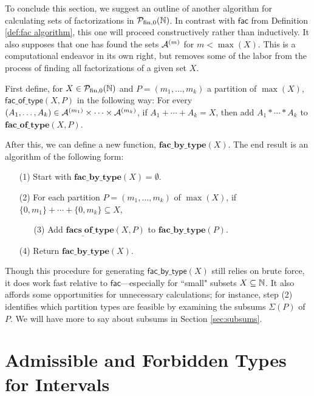 To conclude this section, we suggest an outline of another algorithm for calculating sets of factorizations in ${\mathcal{P}_{\textrm{fin},0}(\mathbb{N})}$.
In contrast with $\mathsf{fac}$ from Definition \ref{def:fac algorithm}, this one will proceed constructively rather than inductively.
It also supposes that one has found the sets $\mathcal{A}^{(m)}$ for $m < \max(X)$.
This is a computational endeavor in its own right, but removes some of the labor from the process of finding all factorizations of a given set $X$.

First define, for $X\in {\mathcal{P}_{\textrm{fin},0}(\mathbb{N})}$ and $P = (m_1,\dots,m_k)$ a partition of $\max(X)$, $\mathsf{fac\_of\_type}(X,P)$ in the following way:
For every $(A_1,\dots,A_k)\in \mathcal{A}^{(m_1)}\times\cdots\times\mathcal{A}^{(m_k)}$, if $A_1 + \cdots + A_k = X$, then add $A_1 * \cdots * A_k$ to $\mathbf{fac\_of\_type}(X,P)$.

After this, we can define a new function, $\mathbf{fac\_by\_type}(X)$.
The end result is an algorithm of the following form:
\begin{itemize}
	\item[(1)] Start with $\mathbf{fac\_by\_type}(X) = \emptyset$.
	\item[(2)] For each partition $P=(m_1,\dots, m_k)$ of $\max(X)$, if $\{0,m_1\}+\cdots+\{0,m_k\} \subseteq X$,
	\begin{itemize}
		\item[(3)] Add $\mathbf{facs_\_of\_type}(X,P)$ to $\mathbf{fac\_by\_type}(P)$.
	\end{itemize}
	\item[(4)] Return $\mathbf{fac\_by\_type}(X)$.
\end{itemize}

Though this procedure for generating $\mathsf{fac\_by\_type}(X)$ still relies on brute force, it does work fast relative to $\mathsf{fac}$---especially for ``small" subsets $X\subseteq \mathbb{N}$.
It also affords some opportunities for unnecessary calculations; for instance, step (2) identifies which partition types are feasible by examining the subsums $\Sigma(P)$ of $P$.
We will have more to say about subsums in Section \ref{sec:subsums}.



\section{Admissible and Forbidden Types for Intervals} \label{sec:partitions and intervals}






